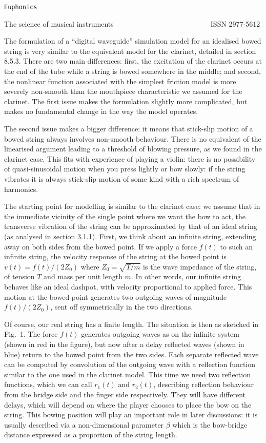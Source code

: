   \tt{}Euphonics\rm{} 

  The science of musical instruments                           ISSN 2977-5612 

  The formulation of a ``digital waveguide'' simulation model for an idealised 
  bowed string is very similar to the equivalent model for the clarinet, 
  detailed in section 8.5.3. There are two main differences: first, the 
  excitation of the clarinet occurs at the end of the tube while a string is 
  bowed somewhere in the middle; and second, the nonlinear function associated 
  with the simplest friction model is more severely non-smooth than the 
  mouthpiece characteristic we assumed for the clarinet. The first issue makes 
  the formulation slightly more complicated, but makes no fundamental change in 
  the way the model operates. 

  The second issue makes a bigger difference: it means that stick-slip motion 
  of a bowed string always involves non-smooth behaviour. There is no 
  equivalent of the linearised argument leading to a threshold of blowing 
  pressure, as we found in the clarinet case. This fits with experience of 
  playing a violin: there is no possibility of quasi-sinusoidal motion when you 
  press lightly or bow slowly: if the string vibrates it is always stick-slip 
  motion of some kind with a rich spectrum of harmonics. 

  The starting point for modelling is similar to the clarinet case: we assume 
  that in the immediate vicinity of the single point where we want the bow to 
  act, the transverse vibration of the string can be approximated by that of an 
  ideal string (as analysed in section 3.1.1). First, we think about an 
  infinite string, extending away on both sides from the bowed point. If we 
  apply a force $f(t)$ to such an infinite string, the velocity response of the 
  string at the bowed point is $v(t)= f(t)/(2Z_0)$ where $Z_0=\sqrt{T/m}$ is 
  the wave impedance of the string, of tension $T$ and mass per unit length 
  $m$. In other words, our infinite string behaves like an ideal dashpot, with 
  velocity proportional to applied force. This motion at the bowed point 
  generates two outgoing waves of magnitude $f(t)/(2Z_0)$, sent off 
  symmetrically in the two directions. 

  Of course, our real string has a finite length. The situation is then as 
  sketched in Fig.\ 1. The force $f(t)$ generates outgoing waves as on the 
  infinite system (shown in red in the figure), but now after a delay reflected 
  waves (shown in blue) return to the bowed point from the two sides. Each 
  separate reflected wave can be computed by convolution of the outgoing wave 
  with a reflection function similar to the one used in the clarinet model. 
  This time we need two reflection functions, which we can call $r_1(t)$ and 
  $r_2(t)$, describing reflection behaviour from the bridge side and the finger 
  side respectively. They will have different delays, which will depend on 
  where the player chooses to place the bow on the string. This bowing position 
  will play an important role in later discussions: it is usually described via 
  a non-dimensional parameter $\beta$ which is the bow-bridge distance 
  expressed as a proportion of the string length. 

